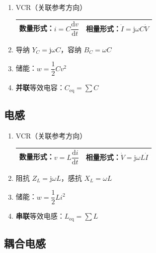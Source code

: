 \documentclass[UTF8,fontset=fandol,zihao=5]{ctexart}
\newcommand{\jj}{\mathrm{j}}
\begin{document}
\begin{enumerate}
  \item VCR（关联参考方向）

  \begin{center}
    \begin{tabularx}{0.92\textwidth}{XX}
      \toprule
      数量形式：\(i=C\dfrac{\mathrm{d}v}{\mathrm{d}t}\) & 相量形式：\(\dot I=\jj\omega C\dot V\) \\
      \bottomrule
    \end{tabularx}
  \end{center}

  \item 导纳 \(Y_C=\jj\omega C\)，容纳 \(B_C=\omega C\)
  \item 储能：\(w=\dfrac{1}{2}Cv^2\)
  \item \textbf{并联}等效电容：\(C_{\mathrm{eq}}=\displaystyle\sum C\)
\end{enumerate}

\subsection{电感}

\begin{enumerate}
  \item VCR（关联参考方向）

  \begin{center}
    \begin{tabularx}{0.92\textwidth}{XX}
      \toprule
      数量形式：\(v=L\dfrac{\mathrm{d}i}{\mathrm{d}t}\) & 相量形式：\(\dot V=\jj\omega L\dot I\) \\
      \bottomrule
    \end{tabularx}
  \end{center}

  \item 阻抗 \(Z_L=\jj\omega L\)，感抗 \(X_L=\omega L\)
  \item 储能：\(w=\dfrac{1}{2}Li^2\)
  \item \textbf{串联}等效电感：\(L_{\mathrm{eq}}=\displaystyle\sum L\)
\end{enumerate}

\subsection{耦合电感}
\end{document}
